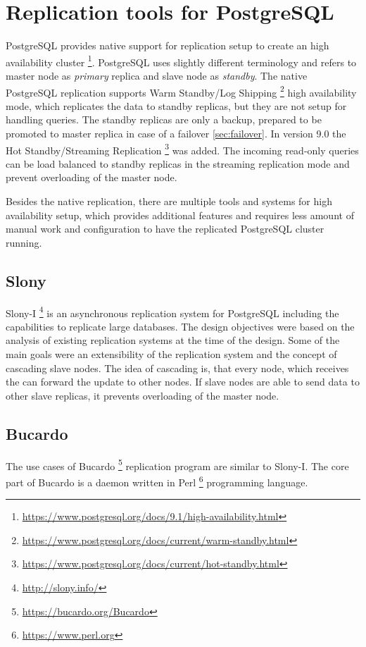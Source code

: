 \documentclass[
  digital, %
  twoside, %
  table,   %
  lof,     %
  lot,     %
]{fithesis3}
\begin{document}
\section{Replication tools for PostgreSQL} \label{sec:pg_replication}
PostgreSQL provides native support for replication setup to create an high availability cluster \footnote{\url{https://www.postgresql.org/docs/9.1/high-availability.html}}. PostgreSQL uses slightly different terminology and refers to master node as \textit{primary} replica and slave node as \textit{standby}. The native PostgreSQL replication supports Warm Standby/Log Shipping \footnote{\url{https://www.postgresql.org/docs/current/warm-standby.html}} high availability mode, which replicates the data to standby replicas, but they are not setup for handling queries. The standby replicas are only a backup, prepared to be promoted to master replica in case of a failover \ref{sec:failover}. In version 9.0 the Hot Standby/Streaming Replication \footnote{\url{https://www.postgresql.org/docs/current/hot-standby.html}} was added. The incoming read-only queries can be load balanced to standby replicas in the streaming replication mode and prevent overloading of the master node.

Besides the native replication, there are multiple tools and systems for high availability setup, which provides additional features and requires less amount of manual work and configuration to have the replicated PostgreSQL cluster running.

\subsection{Slony}
Slony-I \footnote{\url{http://slony.info/}} is an asynchronous replication system for PostgreSQL including the capabilities to replicate large databases. The design objectives were based on the analysis of existing replication systems at the time of the design. Some of the main goals were an extensibility of the replication system and the concept of cascading slave nodes. The idea of cascading is, that every node, which receives the can forward the update to other nodes. If slave nodes are able to send data to other slave replicas, it prevents overloading of the master node.

\subsection{Bucardo}
The use cases of Bucardo \footnote{\url{https://bucardo.org/Bucardo}} replication program are similar to Slony-I. The core part of Bucardo is a daemon written in Perl \footnote{\url{https://www.perl.org}} programming language.
\end{document}
